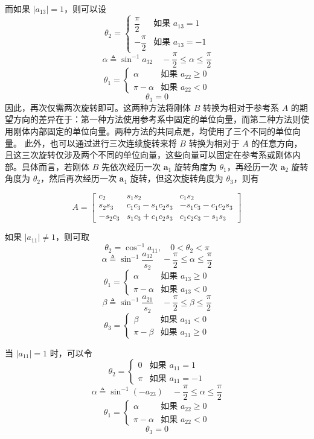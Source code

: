 而如果 $|a_{13}| = 1$，则可以设
$$
\theta_2 = \begin{cases} \dfrac{\pi}{2} & \text{如果 } a_{13} = 1 \\[4pt] -\dfrac{\pi}{2} & \text{如果 } a_{13} = -1 \end{cases}
$$
$$
\alpha \triangleq \sin^{-1} a_{32} \quad -\frac{\pi}{2} \le \alpha \le \frac{\pi}{2}
$$
$$
\theta_1 = \begin{cases} \alpha & \text{如果 } a_{22} \ge 0 \\ \pi - \alpha & \text{如果 } a_{22} < 0 \end{cases}
$$
$$
\theta_3 = 0
$$
因此，再次仅需两次旋转即可。这两种方法将刚体 $B$ 转换为相对于参考系 $A$ 的期望方向的差异在于：第一种方法使用参考系中固定的单位向量，而第二种方法则使用刚体内部固定的单位向量。两种方法的共同点是，均使用了三个不同的单位向量。
\blocksep
此外，也可以通过进行三次连续旋转来将 $B$ 转换为相对于 $A$ 的任意方向，且这三次旋转仅涉及两个不同的单位向量，这些向量可以固定在参考系或刚体内部。具体而言，若刚体 $B$ 先依次经历一次 $\mathbf{a}_1$ 旋转角度为 $\theta_1$，再经历一次 $\mathbf{a}_2$ 旋转角度为 $\theta_2$，然后再次经历一次 $\mathbf{a}_1$ 旋转，但这次旋转角度为 $\theta_3$，则有

\begin{equation}\label{eq:方向角:a1a2a1}
A = \left[
\begin{array}{ccc}
c_2 & s_1 s_2 & c_1 s_2 \\
s_2 s_3 & c_1 c_3 - s_1 c_2 s_3 & -s_1 c_3 - c_1 c_2 s_3 \\
-s_2 c_3 & s_1 c_3 + c_1 c_2 s_3 & c_1 c_2 c_3 - s_1 s_3
\end{array}
\right]
\end{equation}

如果 $|a_{11}| \ne 1$，则可取
$$
\theta_2 = \cos^{-1} a_{11},\quad 0 < \theta_2 < \pi
$$
$$
\alpha \triangleq \sin^{-1}\frac{a_{12}}{s_2} \quad -\frac{\pi}{2} \le \alpha \le \frac{\pi}{2}
$$
$$
\theta_1 = \begin{cases} \alpha & \text{如果 } a_{13} \ge 0 \\ \pi - \alpha & \text{如果 } a_{13} < 0 \end{cases}
$$
$$
\beta \triangleq \sin^{-1}\frac{a_{21}}{s_2} \quad -\frac{\pi}{2} \le \beta \le \frac{\pi}{2}
$$
$$
\theta_3 = \begin{cases} \beta & \text{如果 } a_{31} < 0 \\ \pi - \beta & \text{如果 } a_{31} \ge 0 \end{cases}
$$

当 $|a_{11}| = 1$ 时，可以令
$$
\theta_2 = \begin{cases} 0 & \text{如果 } a_{11} = 1 \\ \pi & \text{如果 } a_{11} = -1 \end{cases}
$$
$$
\alpha \triangleq \sin^{-1}(-a_{23}) \quad -\frac{\pi}{2} \le \alpha \le \frac{\pi}{2}
$$
$$
\theta_1 = \begin{cases} \alpha & \text{如果 } a_{22} \ge 0 \\ \pi - \alpha & \text{如果 } a_{22} < 0 \end{cases}
$$
$$
\theta_3 = 0
$$

